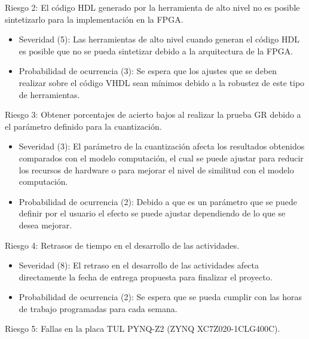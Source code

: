 \documentclass[11pt]{charter}
\begin{document}
Riesgo 2: El código HDL generado por la herramienta de alto nivel no es posible sintetizarlo para la implementación en la FPGA.

\begin{itemize}

\item Severidad (5): Las herramientas de alto nivel cuando generan el código HDL es posible que no se pueda sintetizar debido a la arquitectura de la FPGA. 

\item Probabilidad de ocurrencia (3): Se espera que los ajustes que se deben realizar sobre el código VHDL sean mínimos debido a la robustez de este tipo de herramientas.
  
\end{itemize}  

Riesgo 3: Obtener porcentajes de acierto bajos al realizar la prueba GR debido a el parámetro definido para  la cuantización.

\begin{itemize}

\item Severidad (3): El parámetro de la cuantización afecta los resultados obtenidos comparados con el modelo computación, el cual se puede ajustar para reducir los recursos de hardware o para mejorar el nivel de similitud con el modelo computación. 

\item Probabilidad de ocurrencia (2): Debido a que es un parámetro que se puede definir por el usuario el efecto se puede ajustar dependiendo de lo que se desea mejorar. 
  
\end{itemize}  

Riesgo 4: Retrasos de tiempo en el desarrollo de las actividades.

\begin{itemize}

\item Severidad (8): El retraso en el desarrollo de las actividades afecta directamente la fecha de entrega propuesta para finalizar el proyecto. 

\item Probabilidad de ocurrencia (2): Se espera que se pueda cumplir con las horas de trabajo programadas para cada semana. 
  
\end{itemize}  

Riesgo 5: Fallas en la placa TUL PYNQ-Z2 (ZYNQ XC7Z020-1CLG400C).
\end{document}

